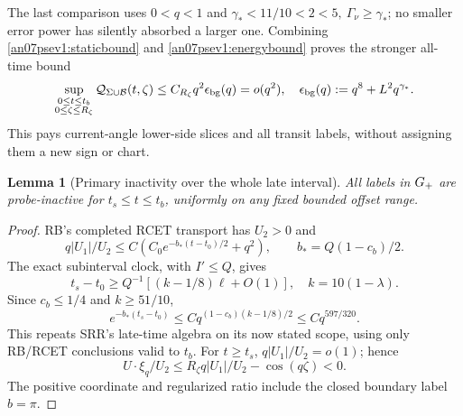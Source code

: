\documentclass[11pt]{article}
\numberwithin{equation}{section}
\newtheorem{lemma}[theorem]{Lemma}
\theoremstyle{remark}\newtheorem{remark}[theorem]{Remark}
\begin{document}
The last comparison uses \(0<q<1\) and
\(\gamma_*<11/10<2<5,\ \Gamma_\nu\ge\gamma_*\);
no smaller error power has silently absorbed a larger one.
Combining \eqref{an07psev1:staticbound} and
\eqref{an07psev1:energybound} proves the stronger all-time bound
\begin{equation}
 \sup_{\substack{0\le t\le t_b\\0\le\zeta\le R_\zeta}}
 \mathcal Q_{\Sigma\cup\mathcal B}(t,\zeta)
 \le C_{R_\zeta}q^2\epsilon_{\rm bg}(q)=o(q^2),
 \quad
 \epsilon_{\rm bg}(q):=q^8+L^2q^{\gamma_*}.
 \label{an07psev1:Qpaid}
\end{equation}
This pays current-angle lower-side slices and all transit
labels, without assigning them a new sign or chart.

\begin{lemma}[Primary inactivity over the whole late interval]
\label{an07psev1:inactive}
All labels in \({G_+}\) are probe-inactive for
\(t_s\le t\le t_b\), uniformly on any fixed bounded offset range.
\end{lemma}
\begin{proof}
RB's completed RCET transport has \(U_2>0\) and
\[
 q|U_1|/U_2\le C(C_0e^{-b_*(t-t_0)/2}+q^2),\qquad
 b_*=Q(1-c_b)/2 .
 \]
The exact subinterval clock, with \(I'\le Q\), gives
\[
 t_s-t_0\ge Q^{-1}[(k-1/8)\ell+O(1)],
 \quad k=10(1-\lambda).
 \]
Since \(c_b\le1/4\) and \(k\ge51/10\),
\[
 e^{-b_*(t_s-t_0)}
 \le Cq^{(1-c_b)(k-1/8)/2}\le Cq^{597/320}.
 \]
This repeats SRR's late-time algebra on its now stated
scope, using only RB/RCET conclusions valid to \(t_b\).
For \(t\ge t_s\), \(q|U_1|/U_2=o(1)\); hence
\[
 U\cdot\xi_q/U_2
 \le R_\zeta q|U_1|/U_2-\cos(q\zeta)<0 .
 \]
The positive coordinate and regularized ratio include
the closed boundary label \(b=\pi\).
\end{proof}
\end{document}
